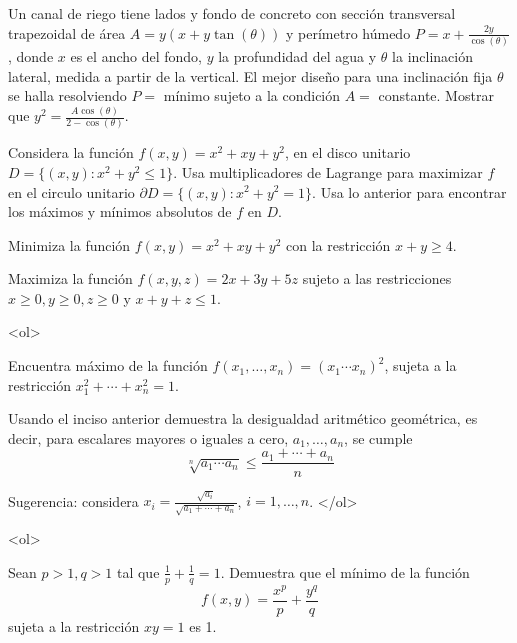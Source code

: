 \documentclass{article}
\theoremstyle{definition}
\begin{document}
        \item Un canal de riego tiene lados y fondo de concreto con
          sección transversal trapezoidal de área $A=y(x+y\tan(\theta))$
          y perímetro húmedo $P=x+\frac{2y}{\cos(\theta)}$, donde
          $x$ es el ancho del fondo, $y$ la profundidad del agua y
          $\theta$ la inclinación lateral, medida a partir de la
          vertical. El mejor dise\~no para una inclinación
          fija $\theta$ se halla resolviendo $P=$ mínimo
          sujeto a la condición $A=$ constante. Mostrar que
          $y^2=\frac{A\cos(\theta)}{2-\cos(\theta)}$.

        \item Considera la función $f(x,y)=x^2+xy+y^2$,
          en el disco unitario $D=\{(x,y): x^2+y^2 \leq 1\}$. Usa
          multiplicadores de Lagrange para maximizar $f$ en
          el circulo unitario  $\partial D=\{(x,y): x^2+y^2=1\}$. Usa
          lo anterior para encontrar los máximos y mínimos absolutos
          de $f$ en $D$.
          
        \item Minimiza la función $f(x,y)=x^2+xy+y^2$ con
          la restricción $x+y \geq 4$.

          
          
        \item Maximiza la función $f(x,y,z)=2x+3y+5z$ sujeto
          a las restricciones $x\geq 0, y\geq 0, z\geq 0 $ y
          $x+y+z \leq 1$.


        \item 
          <ol>
          \item Encuentra máximo de la función
            $f(x_1,\dots, x_n)=(x_1\cdots x_n)^2$, sujeta a la
            restricción $x_1^2+\cdots +x_n^2=1$.
          \item Usando el inciso anterior demuestra la
            desigualdad aritmético geométrica, es decir,
            para escalares mayores o iguales a cero, $a_1,\dots, a_n$,
            se cumple
            $$
            \sqrt[n]{a_1\cdots a_n} \leq \frac{a_1+\cdots +a_n}{n}
            $$

            Sugerencia: considera
            $x_i=\frac{\sqrt{a_i}}{\sqrt{a_1+\cdots +a_n}}$, $i=1,\dots,n$.
          </ol>

        \item
          <ol>
          \item Sean $p>1, q>1$ tal que $\frac{1}{p}+\frac{1}{q}=1$. Demuestra
            que el mínimo de la función
            $$
            f(x,y)=\frac{x^p}{p}+\frac{y^q}{q}
            $$
            sujeta a la restricción $xy=1$ es 1.
\end{document}
